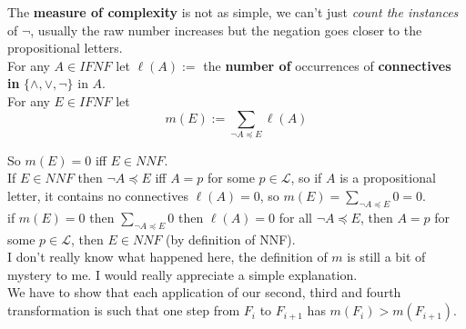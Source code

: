 \documentclass[11pt]{article}
\begin{document}
	The \textbf{measure of complexity} is not as simple, we can't just \textit{count the instances} of $\neg$, usually the raw number increases but the negation goes closer to the propositional letters.\\
	
	For any $A \in IFNF$ let $\ell(A) :=$ the \textbf{number of} occurrences of \textbf{connectives in} $\{\wedge, \vee, \neg\}$ in $A$.\\
	
	For any $E \in IFNF$ let 
	$$m (E):= \sum_{\neg A \preceq E} \ell(A)$$
	
	So $m(E) = 0$ iff $E \in NNF$.\\
	
	If $E \in NNF$ then $\neg A \preceq E$ iff $A = p$ for some $p \in \mathcal{L}$, so if $A$ is a propositional letter, it contains no connectives $\ell (A) = 0$, so $m(E) = \sum_{\neg A \preceq E} 0 = 0$.\\
	
	if $m(E) = 0$ then $\sum_{\neg A \preceq E} 0$ then $\ell(A) = 0$ for all $\neg A \preceq E$, then $A = p$ for some $p \in \mathcal{L}$, then $E \in NNF$ (by definition of NNF).\\
	
	I don't really know what happened here, the definition of $m$ is still a bit of mystery to me. I would really appreciate a simple explanation.\\
	
	We have to show that each application of our second, third and fourth transformation is such that one step from $F_i$ to $F_{i+1}$ has $m(F_i) > m(F_{i+1})$.\\
	
\end{document}
